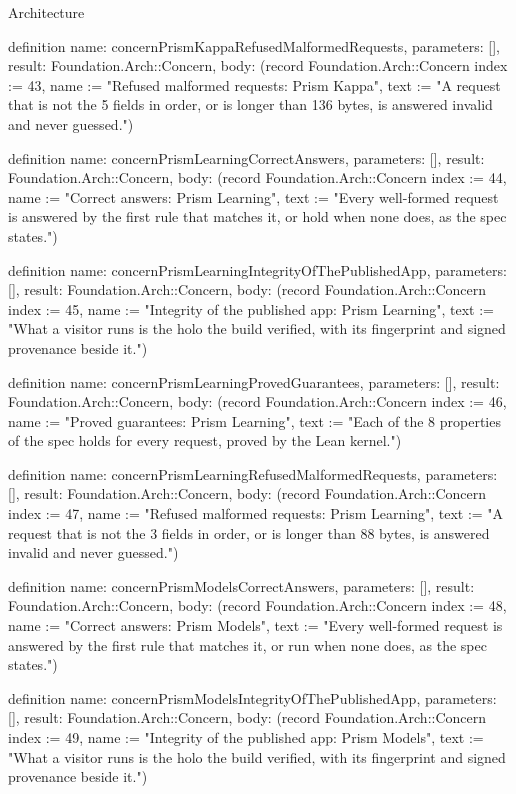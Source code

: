\begin{lexlean}{Architecture}
\begin{semanticmodule}
definition{
  name: concernPrismKappaRefusedMalformedRequests,
  parameters: [],
  result: Foundation.Arch::Concern,
  body: (record Foundation.Arch::Concern {index := 43, name := "Refused malformed requests: Prism Kappa", text := "A request that is not the 5 fields in order, or is longer than 136 bytes, is answered invalid and never guessed."})
}

definition{
  name: concernPrismLearningCorrectAnswers,
  parameters: [],
  result: Foundation.Arch::Concern,
  body: (record Foundation.Arch::Concern {index := 44, name := "Correct answers: Prism Learning", text := "Every well-formed request is answered by the first rule that matches it, or hold when none does, as the spec states."})
}

definition{
  name: concernPrismLearningIntegrityOfThePublishedApp,
  parameters: [],
  result: Foundation.Arch::Concern,
  body: (record Foundation.Arch::Concern {index := 45, name := "Integrity of the published app: Prism Learning", text := "What a visitor runs is the holo the build verified, with its fingerprint and signed provenance beside it."})
}

definition{
  name: concernPrismLearningProvedGuarantees,
  parameters: [],
  result: Foundation.Arch::Concern,
  body: (record Foundation.Arch::Concern {index := 46, name := "Proved guarantees: Prism Learning", text := "Each of the 8 properties of the spec holds for every request, proved by the Lean kernel."})
}

definition{
  name: concernPrismLearningRefusedMalformedRequests,
  parameters: [],
  result: Foundation.Arch::Concern,
  body: (record Foundation.Arch::Concern {index := 47, name := "Refused malformed requests: Prism Learning", text := "A request that is not the 3 fields in order, or is longer than 88 bytes, is answered invalid and never guessed."})
}

definition{
  name: concernPrismModelsCorrectAnswers,
  parameters: [],
  result: Foundation.Arch::Concern,
  body: (record Foundation.Arch::Concern {index := 48, name := "Correct answers: Prism Models", text := "Every well-formed request is answered by the first rule that matches it, or run when none does, as the spec states."})
}

definition{
  name: concernPrismModelsIntegrityOfThePublishedApp,
  parameters: [],
  result: Foundation.Arch::Concern,
  body: (record Foundation.Arch::Concern {index := 49, name := "Integrity of the published app: Prism Models", text := "What a visitor runs is the holo the build verified, with its fingerprint and signed provenance beside it."})
}


\end{semanticmodule}
\end{lexlean}
